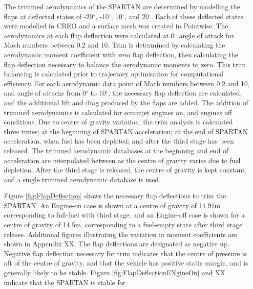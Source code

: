 The trimmed aerodynamics of the SPARTAN are determined by modelling the flaps at deflected states of -20$^\circ$, -10$^\circ$, 10$^\circ$, and 20$^\circ$. Each of these deflected states were modelled in CREO and a surface mesh was created in Pointwise. The aerodynamics at each flap deflection were calculated at 0$^\circ$ angle of attack for Mach numbers between 0.2 and 10. Trim is determined by calculating the aerodynamic moment coefficient with zero flap deflection, then calculating the flap deflection necessary to balance the aerodynamic moments to zero. This trim balancing is calculated prior to trajectory optimisation for computational efficiency. For each aerodynamic data point of Mach numbers between 0.2 and 10, and angle of attacks from 0$^\circ$ to 10$^\circ$, the necessary flap deflection are calculated, and the additional lift and drag produced by the flaps are added. The addition of trimmed aerodynamics is calculated for scramjet engines on, and engines off conditions. Due to centre of gravity variation, the trim analysis is calculated three times; at the beginning of SPARTAN acceleration; at the end of SPARTAN acceleration, when fuel has been depleted; and after the third stage has been released. The trimmed aerodynamic databases at the beginning and end of acceleration are interpolated between as the centre of gravity varies due to fuel depletion. After the third stage is released, the centre of gravity is kept constant, and a single trimmed aerodynamic database is used. 

Figure \ref{fig:FlapDeflection} shows the necessary flap deflections to trim the SPARTAN. An Engine-on case is shown at a centre of gravity of  14.91m corresponding to full-fuel with third stage, and an Engine-off case is shown for a centre of gravity of 14.5m, corresponding to a fuel-empty state after third stage release. Additional figures illustrating the variation in moment coefficients are shown in Appendix XX.
The flap deflections are designated as negative up. Negative flap deflection necessary for trim indicates that the centre of pressure is aft of the centre of gravity, and that the vehicle has positive static margin, and is generally likely to be stable. Figure \ref{fig:FlapDeflectionENgineOn} and XX indicate that the SPARTAN is stable for 


